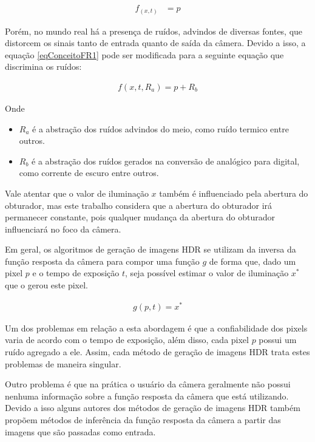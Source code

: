 	
\begin{align} \label{eqConceitoFR1}
          f_{(x,t)} &= p
\end{align}

	Porém, no mundo real há a presença de ruídos, advindos de diversas fontes, que distorcem os sinais tanto de entrada quanto de saída da câmera. Devido a isso, a equação \ref{eqConceitoFR1} pode ser modificada para a seguinte equação que discrimina os ruídos:

\begin{align} \label{eqConceitoFR2}
						f (x, t, R_a) = p + R_b
\end{align}

Onde
\begin{itemize}
	\item $R_a$ é a abstração dos ruídos advindos do meio, como ruído termico entre outros.
	\item $R_b$ é a abstração dos ruídos gerados na conversão de analógico para digital, como corrente de escuro entre outros.
\end{itemize} 
		
	Vale atentar que o valor de iluminação $x$ também é influenciado pela abertura do obturador, mas este trabalho considera que a abertura do obturador irá permanecer constante, pois qualquer mudança da abertura do obturador influenciará no foco da câmera. 
	
	Em geral, os algoritmos de geração de imagens HDR se utilizam da inversa da função resposta da câmera para compor uma função $g$ de forma que, dado um pixel $p$ e o tempo de exposição $t$, seja possível estimar o valor de iluminação $x^*$ que o gerou este pixel.

\begin{align} \label{eqConceitoFR3}
	g(p, t) = x^*
\end{align}
	
	Um dos problemas em relação a esta abordagem é que a confiabilidade dos pixels varia de acordo com o tempo de exposição, além disso, cada pixel $p$ possui um ruído agregado a ele. Assim, cada método de geração de imagens HDR trata estes problemas de maneira singular.
	
	Outro problema é que na prática o usuário da câmera geralmente não possui nenhuma informação sobre a função resposta da câmera que está utilizando. Devido a isso alguns autores dos métodos de geração de imagens HDR também propõem métodos de inferência da função resposta da câmera a partir das imagens que são passadas como entrada.

